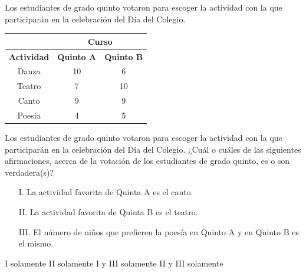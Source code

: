 \documentclass[10pt,letterpaper,addpoints]{exam}
\begin{document}
\begin{multicols}{2}
\begin{questions}
{Los estudiantes de grado quinto votaron para escoger la actividad con la que participarán en la celebración del Día del Colegio.}
\begin{center}
\begin{tabular}{|c|c|c|}
\hline 
 & \multicolumn{2}{c|}{Curso} \\ 
\hline 
\textbf{Actividad} & \textbf{Quinto A} & \textbf{Quinto B} \\ 
\hline 
Danza & 10 & 6 \\ 
\hline 
Teatro & 7 & 10 \\ 
\hline 
Canto & 9 & 9 \\ 
\hline 
Poes\'{i}a & 4 & 5 \\ 
\hline 
\end{tabular} 
\end{center}
Los estudiantes de grado quinto votaron para escoger la actividad con la que participarán en la celebración del Día del Colegio.
\question \label{q-01}
¿Cuál o cuáles de las siguientes afirmaciones, acerca de la votación de los estudiantes de grado quinto, es o son verdadera(s)?
\begin{itemize}
\item[I.] La actividad favorita de Quinta A es el canto.
\item[II.] La actividad favorita de Quinta B es el teatro.
\item[III.] El número de niños que prefieren la poesía en Quinto A y en Quinto B es el mismo.
\end{itemize}
\begin{choices}
\choice I solamente
\CorrectChoice II solamente
\choice I y III solamente
\choice II y III solamente
\end{choices}
\end{questions}
\end{multicols}
\end{document}
